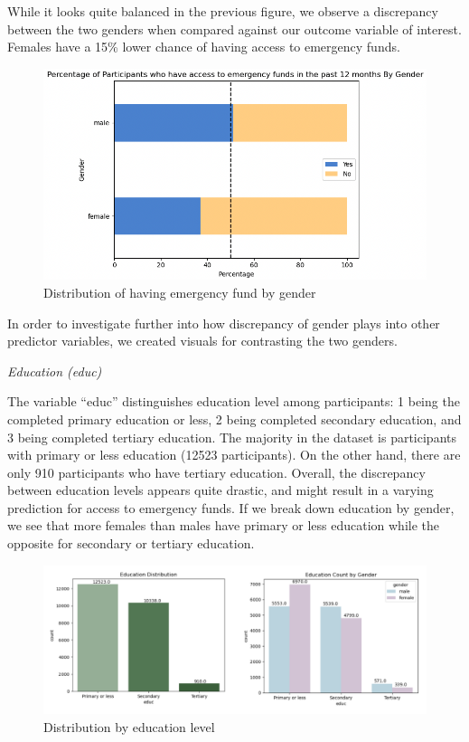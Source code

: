 \documentclass[12pt]{article}
\begin{document}
While it looks quite balanced in the previous figure, we observe a
discrepancy between the two genders when compared against our outcome
variable of interest. Females have a 15\% lower chance of having access
to emergency funds.

\begin{figure}

{\centering \includegraphics[width=1\linewidth]{graphs/f24_graph3} 

}

\caption{Distribution of having emergency fund by gender}\label{fig:unnamed-chunk-6}
\end{figure}

In order to investigate further into how discrepancy of gender plays
into other predictor variables, we created visuals for contrasting the
two genders.

\emph{Education (educ)}

The variable ``educ'' distinguishes education level among participants:
1 being the completed primary education or less, 2 being completed
secondary education, and 3 being completed tertiary education. The
majority in the dataset is participants with primary or less education
(12523 participants). On the other hand, there are only 910 participants
who have tertiary education. Overall, the discrepancy between education
levels appears quite drastic, and might result in a varying prediction
for access to emergency funds. If we break down education by gender, we
see that more females than males have primary or less education while
the opposite for secondary or tertiary education.

\begin{figure}

{\centering \includegraphics[width=1\linewidth]{graphs/f24_graph4} 

}

\caption{Distribution by education level}\label{fig:unnamed-chunk-7}
\end{figure}
\end{document}
